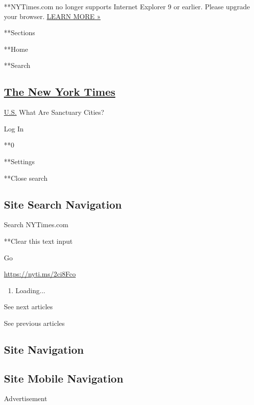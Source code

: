  **NYTimes.com no longer supports Internet Explorer 9 or earlier. Please
upgrade your browser.
\href{http://www.nytimes3xbfgragh.onion/content/help/site/ie9-support.html}{LEARN
MORE »}

**Sections

**Home

**Search

\hypertarget{the-new-york-times}{%
\subsection{\texorpdfstring{\href{http://www.nytimes3xbfgragh.onion/}{The
New York Times}}{The New York Times}}\label{the-new-york-times}}

 \href{https://www.nytimes3xbfgragh.onion/section/us}{U.S.}
\textbar{}What Are Sanctuary Cities?

Log In

**0

**Settings

**Close search

\hypertarget{site-search-navigation}{%
\subsection{Site Search Navigation}\label{site-search-navigation}}

Search NYTimes.com

**Clear this text input

Go

\url{https://nyti.ms/2ci8Fco}

\begin{enumerate}
\def\labelenumi{\arabic{enumi}.}
\item
  Loading...
\end{enumerate}

See next articles

See previous articles

\hypertarget{site-navigation}{%
\subsection{Site Navigation}\label{site-navigation}}

\hypertarget{site-mobile-navigation}{%
\subsection{Site Mobile Navigation}\label{site-mobile-navigation}}

Advertisement

